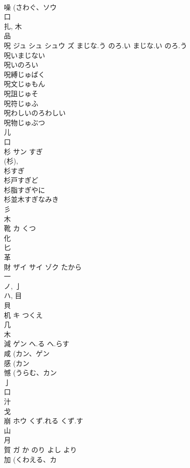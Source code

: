 \documentclass[8pt]{extreport}
\begin{document}
\begin{CJK}{UTF8}{min}
\\	噪 (さわぐ、ソウ 
\\	口 
\\	扎, 木 
\\	品 
\\	呪	ジュ シュ シュウ ズ	まじな.う のろ.い まじな.い のろ.う	
\\	呪いまじない 
\\	呪いのろい 
\\	呪縛じゅばく 
\\	呪文じゅもん 
\\	呪詛じゅそ 
\\	呪符じゅふ 
\\	呪わしいのろわしい 
\\	呪物じゅぶつ 
\\	儿 
\\	口 
\\	杉	サン	すぎ	
\\	(杉), 
\\	杉すぎ
\\	杉戸すぎど
\\	杉脂すぎやに
\\	杉並木すぎなみき
\\	彡 
\\	木 
\\	靴	カ	くつ	
\\	化 
\\	匕 
\\	革 
\\	財	ザイ サイ ゾク	たから	
\\	一 
\\	ノ, 亅 
\\	ハ, 目 
\\	貝 
\\	机	キ	つくえ	
\\	几 
\\	木 
\\	減	ゲン	へ.る へ.らす	
\\	咸 (カン、ゲン 
\\	感 (カン 
\\	憾 (うらむ、カン 
\\	亅 
\\	口 
\\	汁 
\\	戈 
\\	崩	ホウ	くず.れる くず.す	
\\	山 
\\	月 
\\	賀	ガ	か のり よし より	
\\	加 (くわえる、カ 

\end{CJK}
\end{document}
